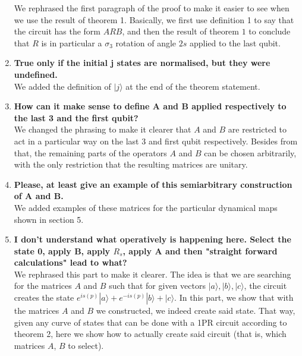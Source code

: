 \documentclass[10pt,letterpaper]{article} %
\begin{document}
\begin{enumerate}
We rephrased the first paragraph of the proof to make it easier to see when we use the result of theorem 1. 
Basically, we first use definition 1 to say that the circuit has the form $ARB$,
and then the result of theorem $1$
to conclude that $R$ is in particular a $\sigma_3$ rotation
of angle $2s$ applied to the last qubit.\\


\item \textbf{True only if the initial j states are normalised, but they were undefined.}\\

We added the definition of $|j\rangle$  at the end of the theorem statement.\\


\item \textbf{How can it make sense to define A and B applied respectively to the last 3 and the first qubit?}\\

We changed the phrasing to make it clearer that $A$ and $B$ 
are restricted to act in a particular way on the last 3 and first qubit respectively.
Besides from that, the remaining parts of the operators $A$ and $B$ can be chosen arbitrarily, 
with the only restriction that the resulting matrices are unitary. \\

\item  \textbf{Please, at least give an example of this semiarbitrary construction of A and B.}\\

We added examples of these matrices for the particular dynamical maps shown in section 5. \\

\item \textbf{I don't understand what operatively is happening here. Select the state 0, apply B, apply $R_s$, apply A and then "straight forward calculations" lead to what?} \\

We rephrased this part to make it clearer. The idea is that we are searching for the matrices $A$ and $B$ such
that for given vectors $|a\rangle, |b\rangle, |c\rangle$, the circuit creates
the state $e^{is(p)} |a \rangle + e^{-is(p)} |b \rangle + |c\rangle$.
In this part, we show that with the matrices $A$ and $B$ we constructed,
we indeed create said state.
That way, given any curve of states that can be done with a 1PR circuit
according to theorem 2, here we show how
to actually create said circuit (that is, which matrices $A$, $B$ to select).\\


\end{enumerate}
\end{document}
